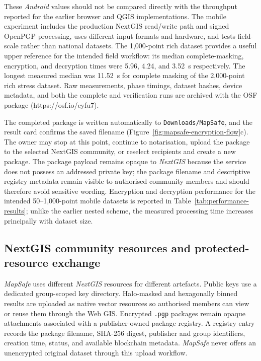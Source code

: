 \documentclass[]{interact}
\begin{document}
These \textit{Android} values should not be compared directly with the throughput reported for the earlier browser and QGIS implementations. The mobile experiment includes the production NextGIS read/write path and signed OpenPGP processing, uses different input formats and hardware, and tests field-scale rather than national datasets. The 1,000-point rich dataset provides a useful upper reference for the intended field workflow: its median complete-masking, encryption, and decryption times were 5.96, 4.24, and 3.52~s respectively. The longest measured median was 11.52~s for complete masking of the 2,000-point rich stress dataset. Raw measurements, phase timings, dataset hashes, device metadata, and both the complete and verification runs are archived with the OSF package (https://osf.io/cyfu7). %

The completed package is written automatically to \texttt{Downloads/MapSafe}, and the result card confirms the saved filename (Figure~\ref{fig:mapsafe-encryption-flow}c). The owner may stop at this point, continue to notarisation, upload the package to the selected NextGIS community, or reselect recipients and create a new package. The package payload remains opaque to \textit{NextGIS} because the service does not possess an addressed private key; the package filename and descriptive registry metadata remain visible to authorised community members and should therefore avoid sensitive wording. Encryption and decryption performance for the intended 50--1,000-point mobile datasets is reported in Table~\ref{tab:performance-results}; unlike the earlier nested scheme, the measured processing time increases principally with dataset size.

\FloatBarrier
\subsection{NextGIS community resources and protected-resource exchange}
\label{sec:community-packages}

\textit{MapSafe} uses different \textit{NextGIS} resources for different artefacts. Public keys use a dedicated group-scoped key directory. Halo-masked and hexagonally binned results are uploaded as native vector resources so authorised members can view or reuse them through the Web GIS. Encrypted \texttt{.pgp} packages remain opaque attachments associated with a publisher-owned package registry. A registry entry records the package filename, SHA-256 digest, publisher and group identifiers, creation time, status, and available blockchain metadata. \textit{MapSafe} never offers an unencrypted original dataset through this upload workflow.
\end{document}
